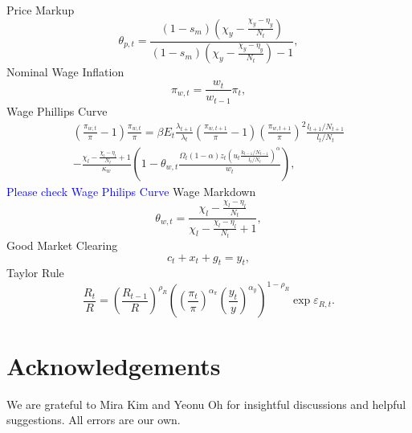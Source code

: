 \documentclass[10pt]{article}
\begin{document}
Price Markup
\begin{equation}
    \theta_{p,t}=\frac{\left(1-s_{m}\right)\left(\chi_{y} - \frac{\chi_{y}-\eta_{y}}{N_{t}}\right)}{\left(1-s_{m}\right)\left(\chi_{y} - \frac{\chi_{y}-\eta_{y}}{N_{t}}\right)-1},
\end{equation}
Nominal Wage Inflation
\begin{equation}
    \pi_{w,t} = \frac{w_{t}}{w_{t-1}}\pi_{t},
\end{equation}
Wage Phillips Curve
\begin{equation}
\begin{aligned}
    \left(\frac{\pi_{w,t}}{\pi}-1 \right)\frac{\pi_{w,t}}{\pi} = \beta E_{t}\frac{\lambda_{t+1}}{\lambda_{t}}\left(\frac{\pi_{w,t+1}}{\pi}-1\right)\left(\frac{\pi_{w,t+1}}{\pi}\right)^{2}\frac{l_{t+1}/N_{t+1}}{l_{t}/N_{t}} \\- \frac{\chi_{l} - \frac{\chi_{l}-\eta_{l}}{N_{t}}+1}{\kappa_{w}}\left(1-\theta_{w,t}\frac{\Omega_{t}\left(1-\alpha\right)z_{t}\left(u_{t}\frac{k_{t-1}/N_{t-1}}{l_{t}/N_{t}}\right)^{\alpha}}{w_{t}}\right),
\end{aligned}
\end{equation}
\textcolor{blue}{Please check Wage Philips Curve}
Wage Markdown
\begin{equation}
    \theta_{w,t}=\frac{\chi_{l} - \frac{\chi_{l}-\eta_{l}}{N_{t}}}{\chi_{l} - \frac{\chi_{l}-\eta_{l}}{N_{t}}+1},
\end{equation}
Good Market Clearing
\begin{equation}
    c_{t}+x_{t}+g_{t} = y_{t},
\end{equation}
Taylor Rule
\begin{equation}
    \frac{R_{t}}{R} = \left(\frac{R_{t-1}}{R} \right)^{\rho_{R}}\left(\left(\frac{\pi_{t}}{\pi}\right)^{\alpha_{\pi}} \left(\frac{y_{t}}{y}\right)^{\alpha_{y}} \right)^{1-\rho_{R}}\exp{\varepsilon_{R,t}}.
\end{equation}
\clearpage
\section*{Acknowledgements}
We are grateful to Mira Kim and Yeonu Oh for insightful discussions and helpful suggestions. All errors are our own. 
\end{document}
